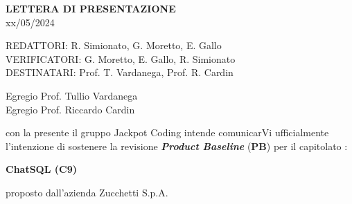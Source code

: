 \documentclass[5pt]{article}
\begin{document}
	\vspace{24pt}
	
	\begin{center}
		\textbf{\LARGE LETTERA DI PRESENTAZIONE}\\
		xx/05/2024
	\end{center}
	
	\vspace{13pt}
	
	\begin{flushleft}
		\begin{spacing}{1.5}
			REDATTORI: R. Simionato, G. Moretto, E. Gallo\\%
			VERIFICATORI: G. Moretto, E. Gallo, R. Simionato\\
			\vspace{7pt}
			DESTINATARI: Prof. T. Vardanega, Prof. R. Cardin\\%
		\end{spacing}
	\end{flushleft}
	
	
	\restoregeometry	
	\pagebreak
	
\begin{flushleft}
	Egregio Prof. Tullio Vardanega\\
	Egregio Prof. Riccardo Cardin\\
\end{flushleft}

\begin{flushleft}
	con la presente il gruppo Jackpot Coding intende comunicarVi ufficialmente l'intenzione di sostenere la revisione \textbf{\textit{Product Baseline}} (\textbf{PB}) per il capitolato :
\end{flushleft}

\begin{center}
	\textbf{ChatSQL (C9)}
\end{center}
proposto dall'azienda Zucchetti S.p.A.\\
\end{document}
